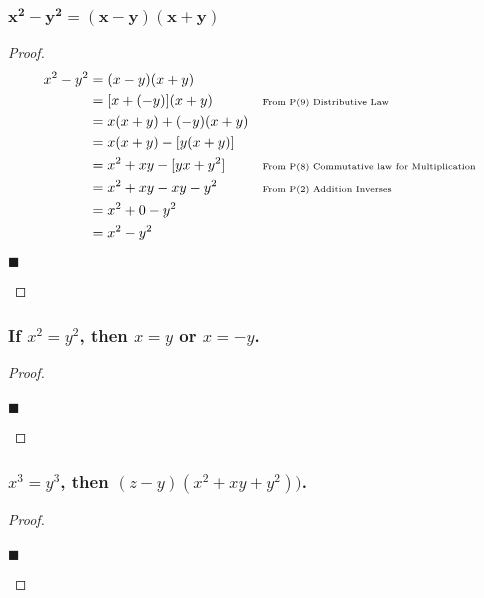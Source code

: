 \documentclass[letterpaper, 10 pt, conference]{ieeeconf}  %
\begin{document}
\subsubsection{$\boldsymbol{x^2 - y^2 = (x - y)(x + y)}$}

\begin{proof}
\begin{align}
     x^2 - y^2&= (x - y)(x + y) && \\
     &=[x + (-y)](x + y) && \text{\tiny{From P(9) Distributive Law}} \\ 
     &=x(x + y) + (-y)(x +y) &&\\
     &=x(x + y) - [y(x +y)] &&\\
     &=x^2 + xy - [yx + y^2] && \text{\tiny{From P(8) Commutative law for Multiplication}}\\
     &=x^2 + xy - xy - y^2 && \text{\tiny{From P(2) Addition Inverses}}\\
     &=x^2 + 0 - y^2 &&\\
     &=x^2 - y^2 &&
\end{align}
\begin{flushright}
$\blacksquare$
\end{flushright}
\end{proof}


\subsubsection{\textbf{If $x^2 = y^2$, then $x = y$ or $x = -y$.}}

\begin{proof}
\begin{align}
    
\end{align}
\begin{flushright}
$\blacksquare$
\end{flushright}
\end{proof}

\subsubsection{\textbf{$x^3 = y^3$, then $(z - y)(x^2 + xy +y^2))$.}}

\begin{proof}
\begin{align}
    
\end{align}
\begin{flushright}
$\blacksquare$
\end{flushright}
\end{proof}
\end{document}
